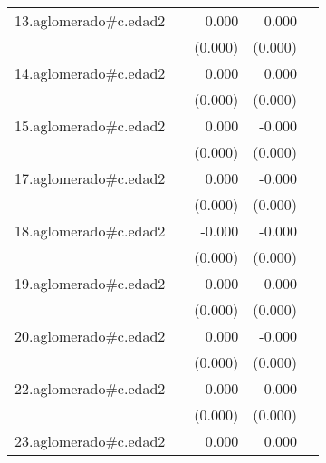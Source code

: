 {\begin{longtable}{l*{4}{D{.}{.}{-1}}}
\addlinespace
13.aglomerado#c.edad2&                     &       0.000\sym{***}&       0.000\sym{**} &                     \\
            &                     &     (0.000)         &     (0.000)         &                     \\
\addlinespace
14.aglomerado#c.edad2&                     &       0.000\sym{***}&       0.000\sym{*}  &                     \\
            &                     &     (0.000)         &     (0.000)         &                     \\
\addlinespace
15.aglomerado#c.edad2&                     &       0.000         &      -0.000         &                     \\
            &                     &     (0.000)         &     (0.000)         &                     \\
\addlinespace
17.aglomerado#c.edad2&                     &       0.000         &      -0.000         &                     \\
            &                     &     (0.000)         &     (0.000)         &                     \\
\addlinespace
18.aglomerado#c.edad2&                     &      -0.000         &      -0.000\sym{*}  &                     \\
            &                     &     (0.000)         &     (0.000)         &                     \\
\addlinespace
19.aglomerado#c.edad2&                     &       0.000\sym{*}  &       0.000         &                     \\
            &                     &     (0.000)         &     (0.000)         &                     \\
\addlinespace
20.aglomerado#c.edad2&                     &       0.000         &      -0.000\sym{*}  &                     \\
            &                     &     (0.000)         &     (0.000)         &                     \\
\addlinespace
22.aglomerado#c.edad2&                     &       0.000         &      -0.000\sym{**} &                     \\
            &                     &     (0.000)         &     (0.000)         &                     \\
\addlinespace
23.aglomerado#c.edad2&                     &       0.000\sym{***}&       0.000         &                     \\

\end{longtable}}
